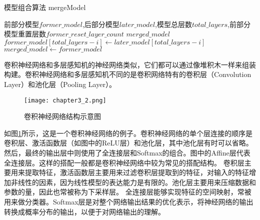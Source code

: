 \begin{algorithm}
	\renewcommand{\algorithmicrequire}{\textbf{Input:}}
	\renewcommand{\algorithmicensure}{\textbf{Output:}}
	\caption{模型组合算法 mergeModel}
	\label{algorithm:mergeModel}
	\begin{algorithmic}[1]
        \REQUIRE 前部分模型$former\_model$,后部分模型$later\_model$,模型总层数$total\_layers$,前部分模型重置层数$former\_reset\_layer\_count$
        \ENSURE  $merged\_model$
            \STATE $former\_model[total\_layers - i] \gets later\_model[total\_layers - i]$
        \ENDFOR
        \STATE $merged\_model \gets former\_model$
	\end{algorithmic}  
\end{algorithm}

卷积神经网络和多层感知机的神经网络类似，它们都可以通过像堆积木一样来组装构建。卷积神经网络和多层感知机不同的是卷积网络特有的卷积层（Convolution Layer）和池化层（Pooling Layer）。

\begin{figure}
    \centering
    \texttt{[image: chapter3\_2.png]}
    \caption{卷积神经网络结构示意图}
    \label{fig:chapter3_2}
\end{figure}

如图\ref{fig:chapter3_2}所示，这是一个卷积神经网络的例子。卷积神经网络的单个层连接的顺序是卷积层、激活函数层（如图中的ReLU层）和池化层，其中池化层有时可以省略。
然后，最终的输出层中则使用了全连接层和Softmax的组合。图中的Affine层代表全连接层。这样的搭配一般都是卷积神经网络中较为常见的搭配结构。
卷积层主要用来提取特征，激活函数层主要用来过滤卷积层提取到的特征，对输入的特征增加非线性的因素，因为线性模型的表达能力是有限的。池化层主要用来压缩数据和参数的量，因此也常被称为下采样层。
全连接层能够实现特征的空间映射，常被用来做分类器。Softmax层是对整个网络输出结果的优化表示，将神经网络的输出转换成概率分布的输出，以便于对网络输出的理解。

